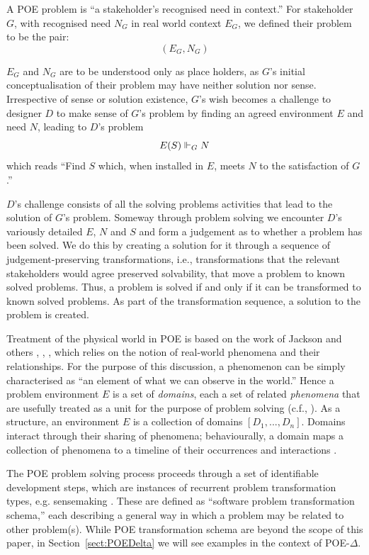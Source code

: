 \documentclass[runningheads,a4paper]{llncs}
\begin{document}
A POE problem is ``a stakeholder's recognised need in context.'' For stakeholder $G$, with recognised need $N_G$ in real world context $E_G$, we defined their problem to be the pair:
%
\[(E_G,N_G)\]
%

$E_G$ and $N_G$ are to be understood only as place holders, as $G$'s initial conceptualisation of their problem may have neither solution nor sense. Irrespective of sense or solution existence, $G$'s wish becomes a challenge to designer $D$ to make sense of $G$'s problem by finding an agreed environment $E$ and need $N$, leading to $D$'s problem
%
\[E(S)\Vdash_{G}N\]
%
which reads ``Find $S$ which, when installed in $E$, meets $N$ to the satisfaction of $G$.''

$D$'s challenge consists of all the solving problems activities that lead to the solution of $G$'s problem. Someway through problem solving we encounter $D$'s variously detailed $E$, $N$ and $S$ and form a judgement as to whether a problem has been solved. We do this by creating a solution for it through a sequence of judgement-preserving transformations, i.e., transformations that the relevant stakeholders would agree preserved solvability, that move a problem to known solved problems. Thus, a problem is solved if and only if it can be transformed to known solved problems. As part of the transformation sequence, a solution to the problem is created.

Treatment of the physical world in POE is based on the work of Jackson and others \cite{896248}, \cite{Jackson2001}, \cite{hall2003reference}, which relies on the notion of real-world phenomena and their relationships. For the purpose of this discussion, a phenomenon can be simply characterised as ``an element of what we can observe in the world.'' Hence a problem environment $E$ is a set of \textit{domains}, each a set of related \textit{phenomena} that are usefully treated as a unit for the purpose of problem solving (c.f., \cite[Page 270]{Jackson2001}). As a structure, an environment $E$ is a collection of  domains $[D_{1},...,D_{n}]$. Domains interact through their sharing of phenomena; behaviourally, a domain maps a collection of phenomena to a timeline of their occurrences and interactions \cite{hall2003reference}.

The POE problem solving process proceeds through a set of identifiable development steps, which are instances of recurrent problem transformation types, e.g. sensemaking \cite{weick1995sensemaking}. These are defined as ``software problem transformation schema,'' each describing a general way in which a problem may be related to other problem(s). While  POE transformation schema are beyond the scope of this paper, in Section~\ref{sect:POEDelta} we will see examples in the context of POE-$\Delta$.
\end{document}
